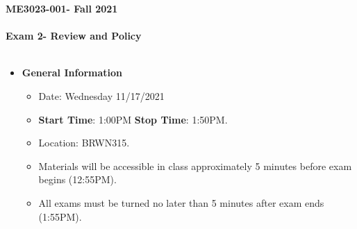\documentclass[11pt]{article}
\newcommand{\EXAMNUM}{2\hspace{0mm}}
\newcommand{\SECNUM}{001\hspace{0mm}}
\begin{document}
\textbf{ \LARGE ME3023-\SECNUM - Fall 2021} \\\\
\textbf{ \LARGE \hspace*{5mm} Exam \EXAMNUM \hspace{2mm}- Review and Policy  } \\\\

\begin{itemize}
	\item  \textbf{\Large General Information}

	\begin{itemize}

		\item Date: Wednesday 11/17/2021
		\item {\bf Start Time}: 1:00PM {\bf Stop Time}: 1:50PM.
		\item Location: BRWN315. 
		 
		\item Materials will be accessible in class approximately 5 minutes before exam begins (12:55PM).
		\item All exams must be turned no later than 5 minutes after exam ends (1:55PM). \vspace{1mm}\\
		
	\end{itemize}


\end{itemize}
\end{document}
